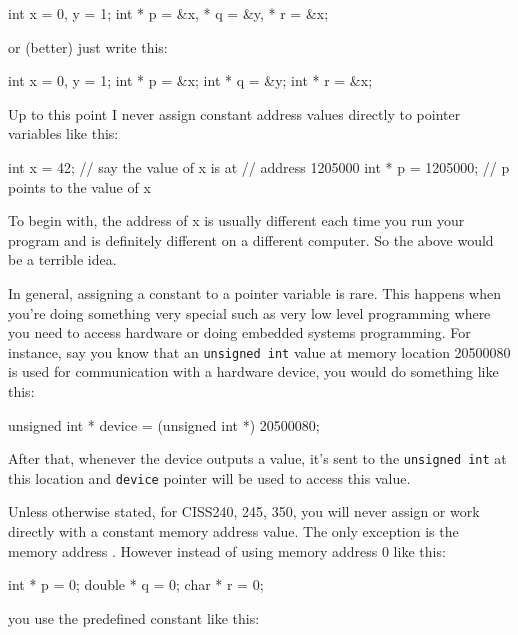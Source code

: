 \begin{consolethree}[escapeinside=||]
int x = 0, y = 1;
int * p = \&x, * q = \&y, * r = \&x;
\end{consolethree}
or (better) just write this:

\begin{consolethree}[escapeinside=||]
int x = 0, y = 1;
int * p = \&x;
int * q = \&y;
int * r = \&x;
\end{consolethree}

\newpage{}

Up to this point I never assign constant address values directly to
pointer variables like this:

\begin{consolethree}[escapeinside=||]
int x = 42;         // say the value of x is at
                    // address 1205000
int * p = 1205000;  // p points to the value of x
\end{consolethree}
To begin with, the address of x is usually different each time you run your program and is definitely different on a different computer. So the above would be a terrible idea.

In general, assigning a constant to a pointer variable is rare. This happens when you're doing something very special such as very low level programming where you need to access hardware or doing embedded systems programming. For instance, say you know that an \texttt{unsigned int} value at memory location 20500080 is used for communication with a hardware device, you would do something like this:

\begin{consolethree}[escapeinside=||]
unsigned int * device = (unsigned int *) 20500080;
\end{consolethree}

After that, whenever the device outputs a value, it's sent to the \texttt{unsigned int} at this location and \texttt{device} pointer will be used to access this value.

Unless otherwise stated, for CISS240, 245, 350, you will never assign or work directly with a constant memory address value. The only exception is the memory address . However instead of using memory address 0 like this:

\begin{consolethree}[escapeinside=||]
int * p = 0;
double * q = 0;
char * r = 0;
\end{consolethree}
you use the predefined constant \texttt{} like this:

